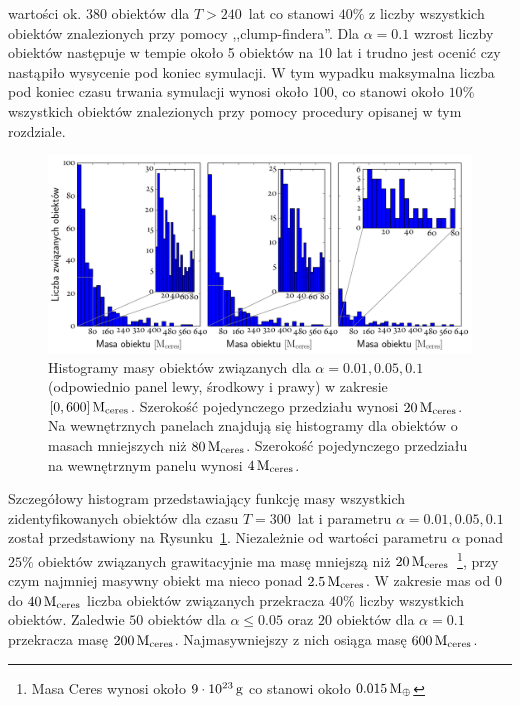 wartości ok. $380$ obiektów dla $T > 240$~lat co stanowi $40\%$ z liczby
wszystkich obiektów znalezionych przy pomocy ,,clump-findera''. Dla $\alpha =
0.1$ wzrost liczby obiektów następuje w tempie około 5 obiektów na 10 lat i
trudno jest ocenić czy nastąpiło wysycenie pod koniec symulacji. W tym wypadku
maksymalna liczba pod koniec czasu trwania symulacji wynosi około $100$, co
stanowi około $10\%$ wszystkich obiektów znalezionych przy pomocy procedury
opisanej w tym rozdziale.
%
\begin{figure}[ht]
   \centering
   \includegraphics[width=0.95\linewidth]{figures/mass_hists}
   \caption{Histogramy masy obiektów związanych dla $\alpha = 0.01, 0.05, 0.1$
   (odpowiednio panel lewy, środkowy i prawy) w zakresie $[0,600]\hbox{$\mathrm{\thinspace M_{\textrm{ceres}}}$}$.
   Szerokość pojedynczego przedziału wynosi $20\hbox{$\mathrm{\thinspace M_{\textrm{ceres}}}$}$. Na wewnętrznych
   panelach znajdują się histogramy dla obiektów o masach mniejszych niż
   $80\hbox{$\mathrm{\thinspace M_{\textrm{ceres}}}$}$. Szerokość pojedynczego przedziału na wewnętrznym panelu wynosi
   $4\hbox{$\mathrm{\thinspace M_{\textrm{ceres}}}$}$.}
   \label{fig:masshist}
\end{figure}
%
\par Szczegółowy histogram przedstawiający funkcję masy wszystkich
zidentyfikowanych obiektów dla czasu $T=300$~lat i parametru $\alpha = 0.01,
0.05, 0.1$ został przedstawiony na Rysunku~\ref{fig:masshist}. Niezależnie od
wartości parametru $\alpha$ ponad $25\%$ obiektów związanych grawitacyjnie ma
masę mniejszą niż $20\hbox{$\mathrm{\thinspace M_{\textrm{ceres}}}$}$~\footnote{Masa Ceres wynosi około
$9\cdot10^{23}\hbox{$\thinspace\textrm{g}$}$ co stanowi około $0.015\hbox{$\mathrm{\thinspace M_{\oplus}}$}$}, przy czym najmniej masywny
obiekt ma nieco ponad $2.5\hbox{$\mathrm{\thinspace M_{\textrm{ceres}}}$}$.  W zakresie mas od $0$ do $40\hbox{$\mathrm{\thinspace M_{\textrm{ceres}}}$}$ liczba
obiektów związanych przekracza $40\%$ liczby wszystkich obiektów. Zaledwie $50$
obiektów dla $\alpha \leq 0.05$ oraz $20$ obiektów dla $\alpha = 0.1$ przekracza
masę $200\hbox{$\mathrm{\thinspace M_{\textrm{ceres}}}$}$.  Najmasywniejszy z nich osiąga masę $600\hbox{$\mathrm{\thinspace M_{\textrm{ceres}}}$}$.
%
